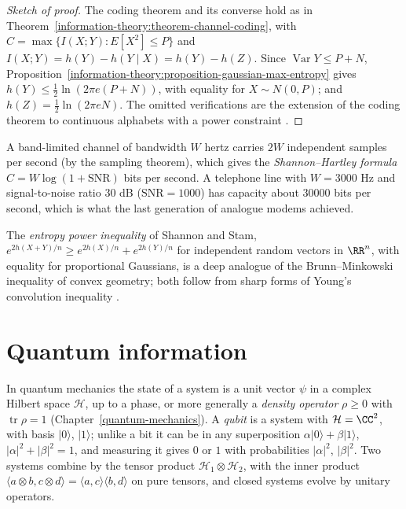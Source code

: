 \begin{proof}[Sketch of proof]
The coding theorem and its converse hold as in Theorem~\ref{information-theory:theorem-channel-coding}, with $C = \max\{I(X; Y) : E[X^2] \leq P\}$ and $I(X; Y) = h(Y) - h(Y \mid X) = h(Y) - h(Z)$. Since $\operatorname{Var}Y \leq P + N$,
Proposition~\ref{information-theory:proposition-gaussian-max-entropy} gives $h(Y) \leq \frac12\ln(2\pi e(P + N))$, with equality for $X \sim N(0, P)$; and $h(Z) = \frac12\ln(2\pi eN)$. The omitted verifications are the extension of the
coding theorem to continuous alphabets with a power constraint \cite{cover-thomas}.
\end{proof}

A band-limited channel of bandwidth $W$ hertz carries $2W$ independent samples per second (by the sampling theorem), which gives the \emph{Shannon--Hartley formula} $C = W\log(1 + \mathrm{SNR})$ bits per second. A telephone line
with $W = 3000$ Hz and signal-to-noise ratio $30$ dB ($\mathrm{SNR} = 1000$) has capacity about $30000$ bits per second, which is what the last generation of analogue modems achieved.

\begin{remark}\label{information-theory:remark-epi}
The \emph{entropy power inequality} of Shannon and Stam, $e^{2h(X + Y)/n} \geq e^{2h(X)/n} + e^{2h(Y)/n}$ for independent random vectors in $\RR^n$, with equality for proportional Gaussians, is a deep analogue of the
Brunn--Minkowski inequality of convex geometry; both follow from sharp forms of Young's convolution inequality \cite{cover-thomas}.
\end{remark}

\section{Quantum information}\label{information-theory:section-quantum}

In quantum mechanics the state of a system is a unit vector $\psi$ in a complex Hilbert space $\mathcal{H}$, up to a phase, or more generally a \emph{density operator} $\rho \geq 0$ with $\operatorname{tr}\rho = 1$ (Chapter~\ref{quantum-mechanics}).
A \emph{qubit} is a system with $\mathcal{H} = \CC^2$, with basis $|0\rangle$, $|1\rangle$; unlike a bit it can be in any superposition $\alpha|0\rangle + \beta|1\rangle$, $|\alpha|^2 + |\beta|^2 = 1$, and measuring it gives $0$ or $1$ with
probabilities $|\alpha|^2$, $|\beta|^2$. Two systems combine by the tensor product $\mathcal{H}_1 \otimes \mathcal{H}_2$, with the inner product $\langle a \otimes b, c \otimes d\rangle = \langle a, c\rangle\langle b, d\rangle$ on pure tensors, and
closed systems evolve by unitary operators.

